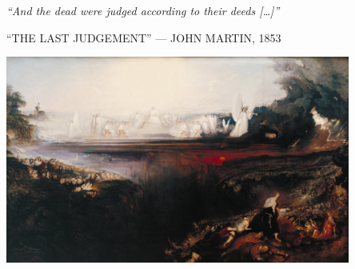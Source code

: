 \begin{pages}
\end{pages} 
\Pages

\clearpage
\thispagestyle{empty}
\null\vfill
\settowidth{}
\begin{center}
\parbox{\longest}{%
  \raggedright{\huge\itshape%
    ``And the dead were judged according to their deeds […]'' \par\bigskip
  }
  \raggedleft\Large\MakeUppercase{``The Last Judgement'' — John Martin, 1853}\par%
}
\vfill\vfill
\clearpage\newpage
\end{center}
\newpage
\thispagestyle{empty}
\begin{center}
	\includegraphics[angle=90, width=0.85\textwidth]{images/illustrations/johnmartinjudgement}
\end{center}